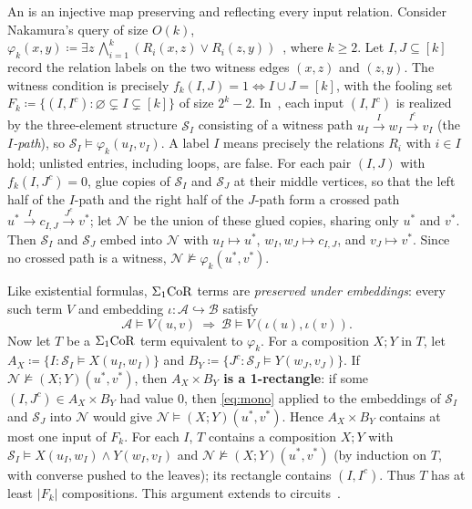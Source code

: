 An  is an injective map preserving and reflecting every input relation.
Consider Nakamura's query of size $O(k)$,
$\varphi_k(x,y)\coloneqq\exists z\,\bigwedge_{i=1}^k
(R_i(x,z)\lor R_i(z,y))$~\citep{nakamura2022}, where $k\ge2$.
Let $I,J\subseteq[k]$ record the relation labels on the two witness
edges $(x,z)$ and $(z,y)$. The witness condition is precisely
$f_k(I,J)=1\iff I\cup J=[k]$, with the fooling set
$F_k\coloneqq\{(I,I^c):\varnothing\subsetneq I\subsetneq[k]\}$ of size
$2^k-2$.
In~\citep[\S5]{nakamura2022}, each input $(I,I^c)$ is realized by the
three-element structure $\mathcal S_I$ consisting of a witness path
$u_I\xrightarrow{\,I\,}w_I\xrightarrow{\,I^c\,}v_I$ (the \emph{$I$-path}), so $\mathcal S_I\models\varphi_k(u_I,v_I)$.
A label $I$ means precisely the relations $R_i$ with $i\in I$ hold; unlisted entries, including loops, are false.
For each pair $(I,J)$ with $f_k(I,J^c)=0$, glue copies of $\mathcal S_I$ and
$\mathcal S_J$ at their middle vertices, so that the left half of the $I$-path
and the right half of the $J$-path form a crossed path
$u^*\xrightarrow{\,I\,}c_{I,J}\xrightarrow{\,J^c\,}v^*$; let $\mathcal N$ be the union of
these glued copies, sharing only $u^*$ and $v^*$.
Then $\mathcal S_I$ and $\mathcal S_J$ embed into $\mathcal N$ with
$u_I\mapsto u^*$, $w_I,w_J\mapsto c_{I,J}$, and $v_J\mapsto v^*$.
Since no crossed path is a witness,
$\mathcal N\not\models\varphi_k(u^*,v^*)$.

Like existential formulas, $\Sigma_1\mathrm{CoR}$ terms are \emph{preserved under
embeddings}:
every such term $V$ and embedding
$\iota\colon\mathcal A\hookrightarrow\mathcal B$ satisfy
\[
\tag{$\diamond$}\label{eq:mono}
\mathcal A\models V(u,v)\ \Longrightarrow\
\mathcal B\models V(\iota(u),\iota(v)).
\]
Now let $T$ be a $\Sigma_1\mathrm{CoR}$ term equivalent to $\varphi_k$.
For a composition $X;Y$ in $T$, let
$A_X\coloneqq\{I:\mathcal S_I\models X(u_I,w_I)\}$ and
$B_Y\coloneqq\{J^c:\mathcal S_J\models Y(w_J,v_J)\}$.
If $\mathcal N\not\models(X;Y)(u^*,v^*)$, then \textbf{$A_X\times B_Y$ is a 1\nobreakdash-rectangle}:
if some $(I,J^c)\in A_X\times B_Y$ had value $0$, then \eqref{eq:mono} applied to
the embeddings of $\mathcal S_I$ and $\mathcal S_J$ into $\mathcal N$ would give
$\mathcal N\models(X;Y)(u^*,v^*)$.
Hence $A_X\times B_Y$ contains at most one input of $F_k$.
For each $I$, $T$ contains a composition $X;Y$ with
$\mathcal S_I\models X(u_I,w_I)\land Y(w_I,v_I)$ and
$\mathcal N\not\models(X;Y)(u^*,v^*)$ (by induction on $T$, with converse pushed to the leaves); its rectangle
contains $(I,I^c)$. Thus $T$ has at least $|F_k|$ compositions.
This argument extends to circuits~\citep[\S6.3]{nakamura2022}.


